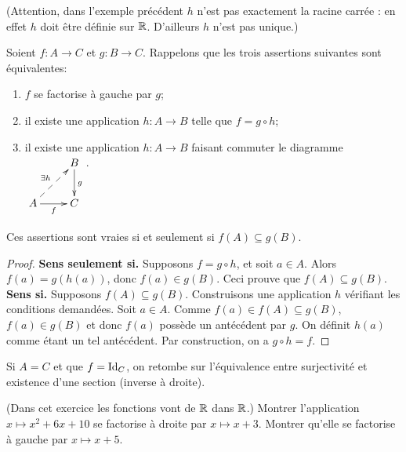 (Attention, dans l'exemple précédent $h$ n'est pas exactement la racine carrée : en effet $h$ doit être définie sur $\mathbb{R}$. D'ailleurs $h$ n'est pas unique.)




\begin{proposition}
\label{prop-CNS-factorisation-gauche}
Soient $f : A\to C$ et $g : B\to C$. Rappelons que les trois assertions suivantes sont équivalentes:
\begin{enumerate}
\item  $f$ se factorise à gauche par $g$;
\item il existe une application $h : A\to B$ telle que $f = g\circ h$;
\item il existe une application $h : A\to B$ faisant commuter le diagramme  
$\xymatrix{
&B \ar[d]^{g} \\
A \ar[r]_f \ar@{-->}[ur]^{\exists h}& C
}$.
\end{enumerate}
Ces assertions sont vraies si et seulement si $f(A)\subseteq g(B)$.
\end{proposition}
\begin{proof}
\textbf{Sens \og seulement si\fg.} Supposons $f = g\circ h$, et soit $a\in A$. Alors $f(a) = g(h(a))$, donc $f(a) \in g(B)$. Ceci prouve que $f(A)\subseteq g(B)$.\\
\textbf{Sens \og si\fg.} Supposons $f(A)\subseteq g(B)$. Construisons une application $h$ vérifiant les conditions demandées. Soit $a\in A$. Comme $f(a) \in f(A) \subseteq g(B)$, $f(a) \in g(B)$ et donc $f(a)$ possède un antécédent par $g$. On définit $h(a)$ comme étant un tel antécédent. Par construction, on a $g\circ h = f$.
\end{proof}

\begin{remarque}
Si $A = C$ et que $f = \operatorname{Id}_C$, on retombe sur l'équivalence entre surjectivité et existence d'une section (inverse à droite).
\end{remarque}

\begin{exercice} 
(Dans cet exercice les fonctions vont de $\mathbb{R}$ dans $\mathbb{R}$.) 
Montrer l'application $x\mapsto x^2+6x+10$ se factorise à droite par $x\mapsto x+3$.
 Montrer qu'elle se factorise à gauche par $x\mapsto x+5$.
\end{exercice}









